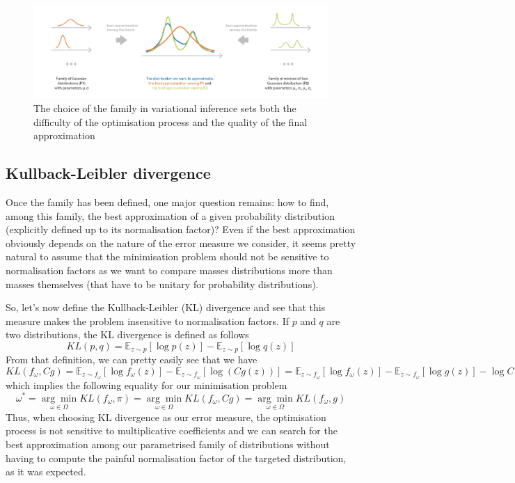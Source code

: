 \begin{figure}[h]
    \centering
\includegraphics[width=\textwidth]{pic/p05c07-snip07.png}
    \caption[The choice of the family in variational inference sets]{The choice of the family in variational inference sets both the difficulty of the optimisation process and the quality of the final approximation}
    \label{fig:p05c07-snip07}
\end{figure}

\subsection{Kullback-Leibler divergence}

Once the family has been defined, one major question remains: how to find, among this family, the best approximation of a given probability distribution (explicitly defined up to its normalisation factor)? Even if the best approximation obviously depends on the nature of the error measure we consider, it seems pretty natural to assume that the minimisation problem should not be sensitive to normalisation factors as we want to compare masses distributions more than masses themselves (that have to be unitary for probability distributions).

So, let's now define the Kullback-Leibler (KL) divergence and see that this measure makes the problem insensitive to normalisation factors. If $p$ and $q$ are two distributions, the KL divergence is defined as follows
\begin{equation}K L(p, q)=\mathbb{E}_{z \sim p}[\log p(z)]-\mathbb{E}_{z \sim p}[\log q(z)]\end{equation}
From that definition, we can pretty easily see that we have
\begin{equation}K L\left(f_{\omega}, C g\right)=\mathbb{E}_{z \sim f_{\omega}}\left[\log f_{\omega}(z)\right]-\mathbb{E}_{z \sim f_{\omega}}[\log (C g(z))]=\mathbb{E}_{z \sim f_{\omega}}\left[\log f_{\omega}(z)\right]-\mathbb{E}_{z \sim f_{\omega}}[\log g(z)]-\log C\end{equation}
which implies the following equality for our minimisation problem
\begin{equation}\omega^{*}=\underset{\omega \in \Omega}{\arg \min } K L\left(f_{\omega}, \pi\right)=\underset{\omega \in \Omega}{\arg \min } K L\left(f_{\omega}, C g\right)=\underset{\omega \in \Omega}{\arg \min } K L\left(f_{\omega}, g\right)\end{equation}
Thus, when choosing KL divergence as our error measure, the optimisation process is not sensitive to multiplicative coefficients and we can search for the best approximation among our parametrised family of distributions without having to compute the painful normalisation factor of the targeted distribution, as it was expected.

